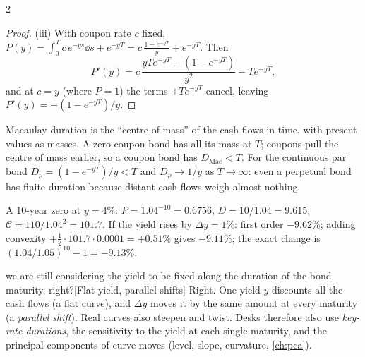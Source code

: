 \begin{paracol}{2}
\begin{proof}
(iii) With coupon rate $c$ fixed, $P(y) = \int_0^T c\,e^{-ys}\dd s + e^{-yT} = c\,\frac{1-e^{-yT}}{y} + e^{-yT}$. Then
\[
P'(y) = c\,\frac{yTe^{-yT} - (1-e^{-yT})}{y^2} - Te^{-yT},
\]
and at $c=y$ (where $P=1$) the terms $\pm Te^{-yT}$ cancel, leaving $P'(y) = -(1-e^{-yT})/y$.
\end{proof}

\begin{intuition}
Macaulay duration is the ``centre of mass'' of the cash flows in time, with present values as
masses. A zero-coupon bond has all its mass at $T$; coupons pull the centre of mass earlier, so a
coupon bond has $D_{\mathrm{Mac}} < T$. For the continuous par bond $D_p = (1-e^{-yT})/y < T$ and
$D_p \to 1/y$ as $T\to\infty$: even a perpetual bond has finite duration because distant cash flows
weigh almost nothing.
\end{intuition}

\begin{example}
A 10-year zero at $y = 4\%$: $P = 1.04^{-10} = 0.6756$, $D = 10/1.04 = 9.615$,
$\mathcal C = 110/1.04^2 = 101.7$. If the yield rises by $\Delta y = 1\%$:
first order $-9.62\%$; adding convexity $+\tfrac12\cdot 101.7\cdot 0.0001 = +0.51\%$ gives $-9.11\%$;
the exact change is $(1.04/1.05)^{10}-1 = -9.13\%$.
\end{example}\begin{answer}{we are still considering the yield to be fixed along the duration of the bond maturity, right?}[Flat yield, parallel shifts]
Right. One yield $y$ discounts all the cash flows (a flat curve), and $\Delta y$ moves it by the same amount at
every maturity (a \emph{parallel shift}). Real curves also steepen and twist. Desks therefore also use
\emph{key-rate durations}, the sensitivity to the yield at each single maturity, and the principal
components of curve moves (level, slope, curvature, \cref{ch:pca}).
\end{answer}


\end{paracol}
